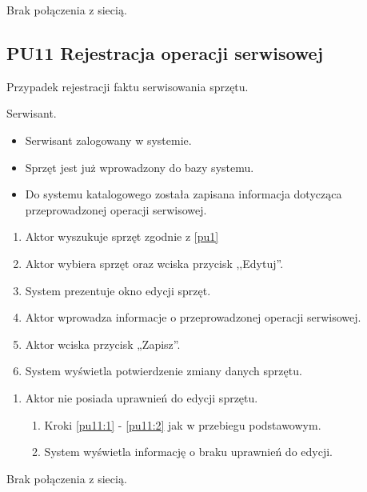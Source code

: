 Brak połączenia z siecią.

\subsection{PU11 Rejestracja operacji serwisowej} \label{pu11}
Przypadek rejestracji faktu serwisowania sprzętu.

Serwisant.

\begin{itemize}
\item Serwisant zalogowany w systemie.
\item Sprzęt jest już wprowadzony do bazy systemu.
\end{itemize}

\begin{itemize}
\item Do systemu katalogowego została zapisana informacja dotycząca przeprowadzonej operacji serwisowej.
\end{itemize}

\begin{enumerate}
	\item \label{pu11:1} Aktor wyszukuje sprzęt zgodnie z \ref{pu1}
	\item \label{pu11:2} Aktor wybiera sprzęt oraz wciska przycisk ,,Edytuj''.
	\item System prezentuje okno edycji sprzęt.
	\item Aktor wprowadza informacje o przeprowadzonej operacji serwisowej.
	\item Aktor wciska przycisk „Zapisz”.
	\item System wyświetla potwierdzenie zmiany danych sprzętu.
\end{enumerate}

\begin{enumerate}
	\item Aktor nie posiada uprawnień do edycji sprzętu.
	\begin{enumerate}[label*=\arabic*.]
		\item Kroki \ref{pu11:1} - \ref{pu11:2} jak w przebiegu podstawowym.
		\item System wyświetla informację o braku uprawnień do edycji.
	\end{enumerate}
\end{enumerate}


Brak połączenia z siecią.